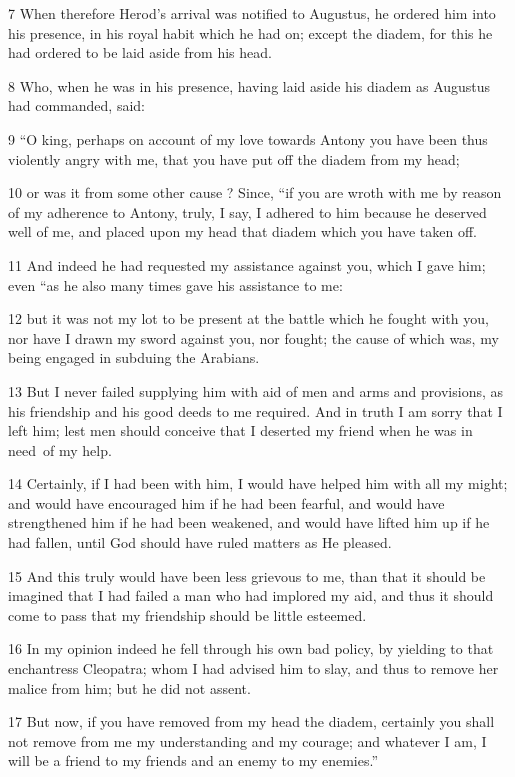 7 When therefore Herod’s arrival was notified to Augustus, he ordered him into his presence, in his royal habit which he had on; except the diadem, for this he had ordered to be laid aside from his head. 

8 Who, when he was in his presence, having laid aside his diadem as Augustus had commanded, said: 

9 “O king, perhaps on account of my love towards Antony you have been thus violently angry with me, that you have put off the diadem from my head; 

10 or was it from some other cause ? Since, “if you are wroth with me by reason of my adherence to Antony, truly, I say, I adhered to him because he deserved well of me, and placed upon my head that diadem which you have taken off. 

11 And indeed he had requested my assistance against you, which I gave him; even “as he also many times gave his assistance to me: 

12 but it was not my lot to be present at the battle which he fought with you, nor have I drawn my sword against you, nor fought; the cause of which was, my being engaged in subduing the Arabians. 

13 But I never failed supplying him with aid of men and arms and provisions, as his friendship and his good deeds to me required. And in truth I am sorry that I left him; lest men should conceive that I deserted my friend when he was in need~of my help. 

14 Certainly, if I had been with him, I would have helped him with all my might; and would have encouraged him if he had been fearful, and would have strengthened him if he had been weakened, and would have lifted him up if he had fallen, until God should have ruled matters as He pleased. 

15 And this truly would have been less grievous to me, than that it should be imagined that I had failed a man who had implored my aid, and thus it should come to pass that my friendship should be little esteemed. 

16 In my opinion indeed he fell through his own bad policy, by yielding to that enchantress Cleopatra; whom I had advised him to slay, and thus to remove her malice from him; but he did not assent. 

17 But now, if you have removed from my head the diadem, certainly you shall not remove from me my understanding and my courage; and whatever I am, I will be a friend to my friends and an enemy to my enemies.”

